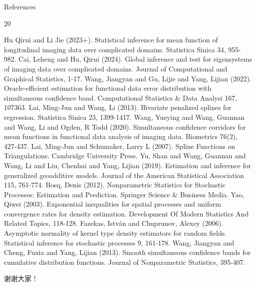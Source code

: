 \documentclass{beamer}
\begin{document}
\begin{frame}{References}
\fontsize{7pt}{2pt}

\begin{thebibliography}{20}

Hu Qirui and Li Jie (2023+). Statistical inference for mean function of longitudinal imaging data over complicated domains. Statistica Sinica 34, 955-982.
Cai, Leheng and Hu, Qirui (2024). Global inference and test for eigensystems of imaging data over complicated domains. Journal of Computational and Graphical Statistics, 1-17.
Wang, Jiangyan and Gu, Lijie and Yang, Lijian (2022). Oracle-efficient estimation for functional data error distribution with simultaneous confidence band. Computational Statistics \& Data Analysi 167, 107363.
Lai, Ming-Jun and Wang, Li (2013). Bivariate penalized splines for regression. Statistica Sinica 23, 1399-1417.
Wang, Yueying and Wang, Guannan and Wang, Li and Ogden, R Todd (2020). Simultaneous confidence corridors for mean functions in functional data analysis of imaging data. Biometrics 76(2), 427-437.
Lai, Ming-Jun and Schumaker, Larry L (2007). Spline Functions on Triangulations. Cambridge University Press.
Yu, Shan and Wang, Guannan and Wang, Li and Liu, Chenhui and Yang, Lijian (2019). Estimation and inference for generalized geoadditive models. Journal of the American Statistical Association 115, 761-774.
Bosq, Denis (2012). Nonparametric Statistics for Stochastic Processes: Estimation and Prediction. Springer Science \& Business Media.
Yao, Qiwei (2003). Exponential inequalities for spatial processes and uniform convergence rates for density estimation. Development Of Modern Statistics And Related Topics, 118-128.
Fazekas, Istv{\'a}n and Chuprunov, Alexey (2006). Asymptotic normality of kernel type density estimators for random fields. Statistical inference for stochastic processes 9, 161-178.
Wang, Jiangyan and Cheng, Fuxia and Yang, Lijian (2013). Smooth simultaneous confidence bands for cumulative distribution functions. Journal of Nonparametric Statistics, 395-407.
\end{thebibliography}
\end{frame}

\begin{frame}
\begin{center}
\Huge{ 谢谢大家 !}
\end{center}
\end{frame}
\end{document}
